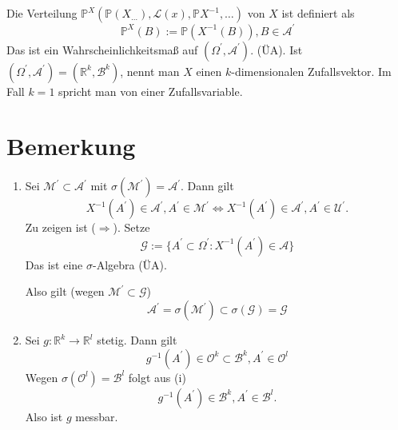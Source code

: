 \documentclass[a4paper,11pt,notitlepage]{report}
\newcommand{\R}{{\ensuremath{\mathbb{R}}}}
\newcommand{\Prim}{{\ensuremath{\mathbb{P}}}}
\begin{document}
Die Verteilung 
$\Prim^{X} (\Prim (X_{\ldots}), \mathcal{L}(x), \Prim X^{-1}, \ldots)$ von $X$ ist definiert als
$$\Prim^X(B):= \Prim(X^{-1}(B)), B \in \mathcal{A}^\prime$$
Das ist ein Wahrscheinlichkeitsmaß auf $(\Omega^\prime, \mathcal{A}^\prime)$.
(ÜA). Ist $(\Omega^\prime, \mathcal{A}^\prime) = (\R^k, \mathcal{B}^k)$, nennt man $X$ einen $k$-dimensionalen Zufallsvektor. Im Fall $k=1$ spricht man von einer Zufallsvariable.

\section{Bemerkung}

\begin{enumerate}
	\item Sei $\mathcal{M}^\prime \subset \mathcal{A}^\prime$ mit $\sigma(\mathcal{M}^\prime) = \mathcal{A}^\prime$. Dann gilt
$$X^{-1}(A^\prime) \in \mathcal{A}^\prime, A^\prime \in \mathcal{M}^\prime \Leftrightarrow X^{-1}(A^\prime) \in \mathcal{A}^\prime, A^\prime \in \mathcal{U}^\prime.$$
Zu zeigen ist ($\Rightarrow$). Setze
$$\mathcal{G}:= \{ A ^\prime \subset \Omega^\prime \colon X^{-1}(A^\prime) \in \mathcal{A} \}$$
Das ist eine $\sigma$-Algebra (ÜA). \newline

Also gilt (wegen $\mathcal{M}^\prime \subset \mathcal{G}$)
$$\mathcal{A}^\prime = \sigma(\mathcal{M}^\prime) \subset \sigma(\mathcal{G}) = \mathcal{G}$$
	\item Sei $g \colon \R^k \rightarrow \R^l$ stetig.
	Dann gilt
	$$g^{-1}(A^\prime) \in \mathcal{O}^k \subset \mathcal{B}^k, A^\prime \in \mathcal{O}^l$$
	Wegen $\sigma(\mathcal{O}^l) = \mathcal{B}^l$ folgt aus (i)
	$$g^{-1}(A^\prime) \in \mathcal{B}^k, A^\prime \in \mathcal{B}^l.$$
	Also ist $g$ messbar.
	

\end{enumerate}
\end{document}
